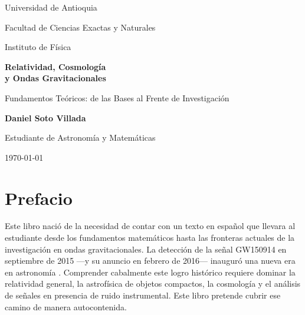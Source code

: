 \documentclass[12pt,oneside]{book}
\newcommand{\NombreAutor}{Daniel Soto Villada}
\newcommand{\Programa}{Estudiante de Astronomía y Matemáticas}
\newcommand{\Universidad}{Universidad de Antioquia}
\newcommand{\Facultad}{Facultad de Ciencias Exactas y Naturales}
\newcommand{\Instituto}{Instituto de Física}
\newcommand{\TituloDocumento}{Relatividad, Cosmología\\[0.4em]y Ondas Gravitacionales}
\newcommand{\Subtitulo}{Fundamentos Teóricos: de las Bases al Frente de Investigación}
\begin{document}
\hypersetup{pageanchor=false}

\begin{titlepage}
    \centering
    \vspace*{1.8cm}

    {\Large\textcolor{grisSec}{\Universidad}\par}
    \vspace{0.25cm}
    {\large\textcolor{grisSec}{\Facultad}\par}
    {\large\textcolor{grisSec}{\Instituto}\par}

    \vspace{2.2cm}
    {\Huge\bfseries\textcolor{azulFis}{\TituloDocumento}\par}
    \vspace{0.5cm}
    {\Large\textcolor{grisSec}{\Subtitulo}\par}

    \vspace{2.4cm}
    \begin{tcolorbox}[colback=grisClaro,colframe=azulFis,boxrule=0.9pt,arc=2mm,width=0.78\textwidth]
        \centering
        {\Large\bfseries \NombreAutor}\par
        \vspace{0.2cm}
        {\large \Programa}
    \end{tcolorbox}

    \vfill
    {\large\textcolor{grisSec}{\today}\par}
    \vspace{0.5cm}
\end{titlepage}

\frontmatter

\chapter*{Prefacio}

Este libro nació de la necesidad de contar con un texto en español que llevara al estudiante desde los fundamentos matemáticos hasta las fronteras actuales de la investigación en ondas gravitacionales. La detección de la señal GW150914 en septiembre de 2015 —y su anuncio en febrero de 2016— inauguró una nueva era en astronomía \cite{Abbott2016prl}. Comprender cabalmente este logro histórico requiere dominar la relatividad general, la astrofísica de objetos compactos, la cosmología y el análisis de señales en presencia de ruido instrumental. Este libro pretende cubrir ese camino de manera autocontenida.
\end{document}
